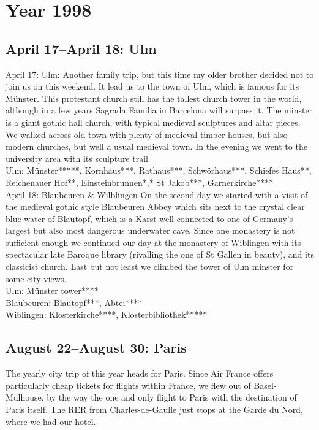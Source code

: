 \chapter{Year 1998}
\label{1998}

\section{April 17--April 18: Ulm}
\label{1998:Ulm}

April 17: Ulm:
Another family trip, but this time my older brother decided not to join us on this weekend. It lead us to the town of Ulm, which is famous for its M\"unster. This protestant church still has the tallest church tower in the world, although in a few years Sagrada Familia in Barcelona will surpass it. The minster is a giant gothic hall church, with typical medieval sculptures and altar pieces. We walked across old town with plenty of medieval timber houses, but also modern churches, but well a usual medieval town. In the evening we went to the university area with its sculpture trail\\

Ulm: M\"unster*****, Kornhaus***, Rathaus***, Schw\"orhaus***, Schiefes Haus**, Reichenauer Hof**, Einsteinbrunnen*,* St Jakob***, Garnerkirche****\\

April 18: Blaubeuren \& Wilblingen
On the second day we started with a visit of the medieval gothic style Blaubeuren Abbey which sits next to the crystal clear blue water of Blautopf, which is a Karst well connected to one of Germany's largest but also most dangerous underwater cave. Since one monastery is not sufficient enough we continued our day at the monastery of Wiblingen with its spectacular late Baroque library (rivalling the one of St Gallen in beauty), and its classicist church. Last but not least we climbed the tower of Ulm minster for some city views.\\

Ulm: M\"unster tower****\\
Blaubeuren: Blautopf***, Abtei****\\
Wiblingen: Klosterkirche****, Klosterbibliothek*****

\section{August 22--August 30: Paris}
\label{1998:Paris}

The yearly city trip of this year heads for Paris. Since Air France offers particularly cheap tickets for flights within France, we flew out of Basel-Mulhouse, by the way the one and only flight to Paris with the destination of Paris itself. The RER from Charles-de-Gaulle just stops at the Garde du Nord, where we had our hotel.\\

